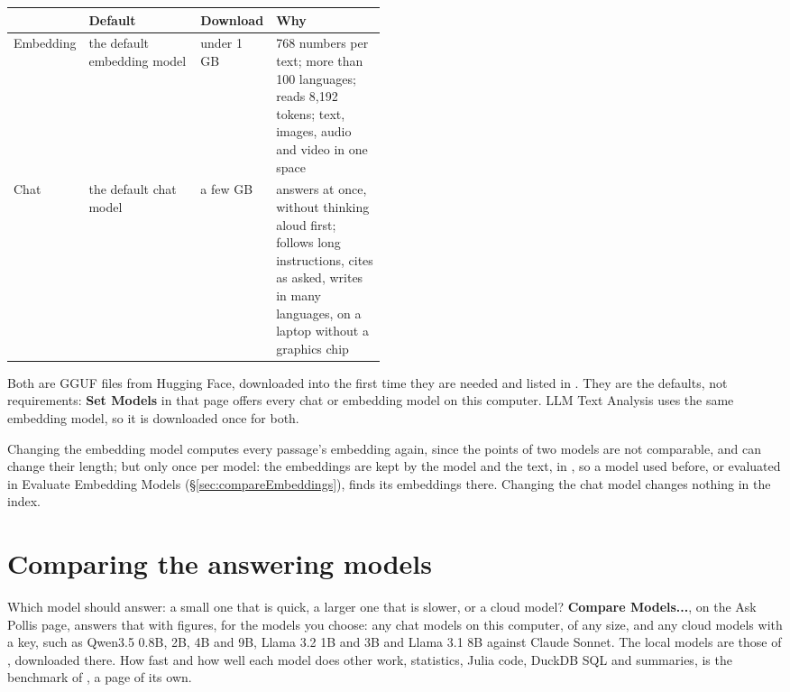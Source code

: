 \begin{center}\small
\renewcommand{\arraystretch}{1.25}
\begin{tabularx}{\linewidth}{@{}p{0.18\linewidth}p{0.3\linewidth}lL@{}}
\toprule
& \textbf{Default} & \textbf{Download} & \textbf{Why}\\
\midrule
Embedding & the default embedding model & under 1 GB & 768 numbers per text; more than 100 languages; reads 8,192
  tokens; text, images, audio and video in one space\\
Chat & the default chat model & a few GB & answers at once, without thinking aloud first; follows long
  instructions, cites as asked, writes in many languages, on a laptop without a graphics chip\\
\bottomrule
\end{tabularx}
\end{center}

Both are GGUF files from Hugging Face, downloaded into  the first time they are needed and listed
in . They are the defaults, not requirements: \textbf{Set Models} in that page
offers every chat or embedding model on this computer. LLM Text Analysis
uses the same embedding model, so it is downloaded once for both.

Changing the embedding model computes every passage's embedding again, since the points of two models are not
comparable, and can change their length; but only once per model: the embeddings are kept by the model and the text,
in , so a model used before, or evaluated in Evaluate Embedding Models
(\S\ref{sec:compareEmbeddings}), finds its embeddings there. Changing the chat model changes nothing in the index.

\section{Comparing the answering models}\label{sec:compare}

Which model should answer: a small one that is quick, a larger one that is slower, or a cloud model? \textbf{Compare
Models...}, on the Ask Pollis page, answers that with figures, for the models you choose: any chat models on this
computer, of any size, and any cloud models with a key, such as Qwen3.5 0.8B, 2B, 4B and 9B, Llama 3.2 1B and 3B and
Llama 3.1 8B against Claude Sonnet. The local models are those of , downloaded there.
How fast and how well each model does other work, statistics, Julia code, DuckDB SQL and summaries, is the benchmark
of , a page of its own.

